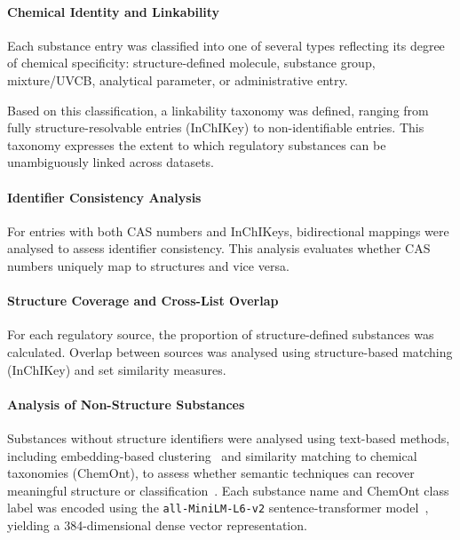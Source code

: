 \paragraph{Chemical Identity and Linkability}
\label{sec:linkability}

Each substance entry was classified into one of several types reflecting its
degree of chemical specificity: structure-defined molecule, substance group,
mixture/UVCB, analytical parameter, or administrative entry.

Based on this classification, a linkability taxonomy was defined, ranging from
fully structure-resolvable entries (InChIKey) to non-identifiable entries.
This taxonomy expresses the extent to which regulatory substances can be
unambiguously linked across datasets.

\paragraph{Identifier Consistency Analysis}

For entries with both CAS numbers and InChIKeys, bidirectional mappings were
analysed to assess identifier consistency. This analysis evaluates whether CAS
numbers uniquely map to structures and vice versa.

\paragraph{Structure Coverage and Cross-List Overlap}

For each regulatory source, the proportion of structure-defined substances was
calculated. Overlap between sources was analysed using structure-based matching
(InChIKey) and set similarity measures.

\paragraph{Analysis of Non-Structure Substances}

Substances without structure identifiers were analysed using text-based
methods, including embedding-based clustering~\cite{Rousseeuw1987,Lloyd1982,McInnes2018} 
and similarity matching to chemical taxonomies (ChemOnt), to assess whether 
semantic techniques can recover meaningful structure or classification~\cite{Manning2008,DjoumbouFeunang2016}.
Each substance name and ChemOnt class label was encoded using the \texttt{all-MiniLM-L6-v2} sentence-transformer model~\cite{Reimers2019,Wang2020MiniLM,devlin-etal-2019-bert}, yielding a 384-dimensional dense vector representation.

